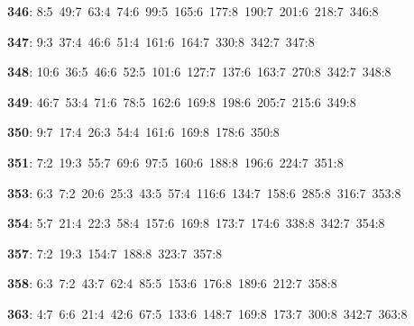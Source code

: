 \noindent \textbf{346}: 8:5\allowbreak\ 49:7\allowbreak\ 63:4\allowbreak\ 74:6\allowbreak\ 99:5\allowbreak\ 165:6\allowbreak\ 177:8\allowbreak\ 190:7\allowbreak\ 201:6\allowbreak\ 218:7\allowbreak\ 346:8\par
\noindent \textbf{347}: 9:3\allowbreak\ 37:4\allowbreak\ 46:6\allowbreak\ 51:4\allowbreak\ 161:6\allowbreak\ 164:7\allowbreak\ 330:8\allowbreak\ 342:7\allowbreak\ 347:8\par
\noindent \textbf{348}: 10:6\allowbreak\ 36:5\allowbreak\ 46:6\allowbreak\ 52:5\allowbreak\ 101:6\allowbreak\ 127:7\allowbreak\ 137:6\allowbreak\ 163:7\allowbreak\ 270:8\allowbreak\ 342:7\allowbreak\ 348:8\par
\noindent \textbf{349}: 46:7\allowbreak\ 53:4\allowbreak\ 71:6\allowbreak\ 78:5\allowbreak\ 162:6\allowbreak\ 169:8\allowbreak\ 198:6\allowbreak\ 205:7\allowbreak\ 215:6\allowbreak\ 349:8\par
\noindent \textbf{350}: 9:7\allowbreak\ 17:4\allowbreak\ 26:3\allowbreak\ 54:4\allowbreak\ 161:6\allowbreak\ 169:8\allowbreak\ 178:6\allowbreak\ 350:8\par
\noindent \textbf{351}: 7:2\allowbreak\ 19:3\allowbreak\ 55:7\allowbreak\ 69:6\allowbreak\ 97:5\allowbreak\ 160:6\allowbreak\ 188:8\allowbreak\ 196:6\allowbreak\ 224:7\allowbreak\ 351:8\par
\noindent \textbf{353}: 6:3\allowbreak\ 7:2\allowbreak\ 20:6\allowbreak\ 25:3\allowbreak\ 43:5\allowbreak\ 57:4\allowbreak\ 116:6\allowbreak\ 134:7\allowbreak\ 158:6\allowbreak\ 285:8\allowbreak\ 316:7\allowbreak\ 353:8\par
\noindent \textbf{354}: 5:7\allowbreak\ 21:4\allowbreak\ 22:3\allowbreak\ 58:4\allowbreak\ 157:6\allowbreak\ 169:8\allowbreak\ 173:7\allowbreak\ 174:6\allowbreak\ 338:8\allowbreak\ 342:7\allowbreak\ 354:8\par
\noindent \textbf{357}: 7:2\allowbreak\ 19:3\allowbreak\ 154:7\allowbreak\ 188:8\allowbreak\ 323:7\allowbreak\ 357:8\par
\noindent \textbf{358}: 6:3\allowbreak\ 7:2\allowbreak\ 43:7\allowbreak\ 62:4\allowbreak\ 85:5\allowbreak\ 153:6\allowbreak\ 176:8\allowbreak\ 189:6\allowbreak\ 212:7\allowbreak\ 358:8\par
\noindent \textbf{363}: 4:7\allowbreak\ 6:6\allowbreak\ 21:4\allowbreak\ 42:6\allowbreak\ 67:5\allowbreak\ 133:6\allowbreak\ 148:7\allowbreak\ 169:8\allowbreak\ 173:7\allowbreak\ 300:8\allowbreak\ 342:7\allowbreak\ 363:8\par
